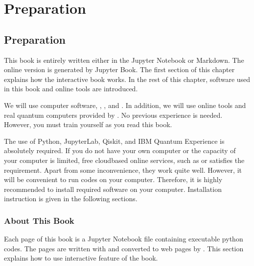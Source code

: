 \documentclass[letterpaper,10pt,english]{jupyterBook}
\begin{document}
\sphinxAtStartPar
{}

\sphinxstepscope


\part{Preparation}

\sphinxstepscope


\chapter{Preparation}
\label{\detokenize{preparation/intro:preparation}}\label{\detokenize{preparation/intro:chap-prerequisites}}\label{\detokenize{preparation/intro::doc}}
\sphinxAtStartPar
This book is entirely written either in the Jupyter Notebook or Markdown. The online version is generated by Jupyter Book.  The first section of this chapter explains how the interactive book works.  In the rest of this chapter, software used in this book and online tools are introduced.

\sphinxAtStartPar
We will use computer software, , , and .  In addition, we will use online tools and real quantum computers provided by .  No previous experience is needed.  However, you must train yourself as you read this book.

\sphinxAtStartPar
The use of Python, JupyterLab, Qiskit, and IBM Quantum Experience is absolutely required. If you do not have your own computer or the capacity of your computer is limited, free cloud\sphinxhyphen{}based online services, such as  or  satisfies the requirement. Apart from some inconvenience, they work quite well.  However, it will be convenient to run codes on your computer.  Therefore, it is highly recommended to install required software on your computer.  Installation instruction is given in the following sections.

\sphinxstepscope


\section{About This Book}
\label{\detokenize{preparation/thisbook:about-this-book}}\label{\detokenize{preparation/thisbook:sec-thisbook}}\label{\detokenize{preparation/thisbook::doc}}
\sphinxAtStartPar
Each page of this book is a Jupyter Notebook file containing executable python codes.  The pages are written with  and converted to web pages by .  This section explains how to use interactive feature of the book.
\end{document}
